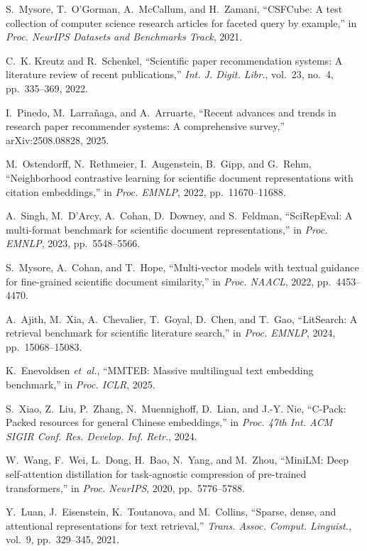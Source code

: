 S.~Mysore, T.~O'Gorman, A.~McCallum, and H.~Zamani, ``CSFCube: A test collection of computer science research articles for faceted query by example,'' in \emph{Proc. NeurIPS Datasets and Benchmarks Track}, 2021.

C.~K. Kreutz and R.~Schenkel, ``Scientific paper recommendation systems: A literature review of recent publications,'' \emph{Int. J. Digit. Libr.}, vol.~23, no.~4, pp.~335--369, 2022.

I.~Pinedo, M.~Larra{\~n}aga, and A.~Arruarte, ``Recent advances and trends in research paper recommender systems: A comprehensive survey,'' arXiv:2508.08828, 2025.

M.~Ostendorff, N.~Rethmeier, I.~Augenstein, B.~Gipp, and G.~Rehm, ``Neighborhood contrastive learning for scientific document representations with citation embeddings,'' in \emph{Proc. EMNLP}, 2022, pp.~11670--11688.

A.~Singh, M.~D'Arcy, A.~Cohan, D.~Downey, and S.~Feldman, ``SciRepEval: A multi-format benchmark for scientific document representations,'' in \emph{Proc. EMNLP}, 2023, pp.~5548--5566.

S.~Mysore, A.~Cohan, and T.~Hope, ``Multi-vector models with textual guidance for fine-grained scientific document similarity,'' in \emph{Proc. NAACL}, 2022, pp.~4453--4470.

A.~Ajith, M.~Xia, A.~Chevalier, T.~Goyal, D.~Chen, and T.~Gao, ``LitSearch: A retrieval benchmark for scientific literature search,'' in \emph{Proc. EMNLP}, 2024, pp.~15068--15083.

K.~Enevoldsen \emph{et~al.}, ``MMTEB: Massive multilingual text embedding benchmark,'' in \emph{Proc. ICLR}, 2025.

S.~Xiao, Z.~Liu, P.~Zhang, N.~Muennighoff, D.~Lian, and J.-Y. Nie, ``C-Pack: Packed resources for general Chinese embeddings,'' in \emph{Proc. 47th Int. ACM SIGIR Conf. Res. Develop. Inf. Retr.}, 2024.

W.~Wang, F.~Wei, L.~Dong, H.~Bao, N.~Yang, and M.~Zhou, ``MiniLM: Deep self-attention distillation for task-agnostic compression of pre-trained transformers,'' in \emph{Proc. NeurIPS}, 2020, pp.~5776--5788.

Y.~Luan, J.~Eisenstein, K.~Toutanova, and M.~Collins, ``Sparse, dense, and attentional representations for text retrieval,'' \emph{Trans. Assoc. Comput. Linguist.}, vol.~9, pp.~329--345, 2021.

